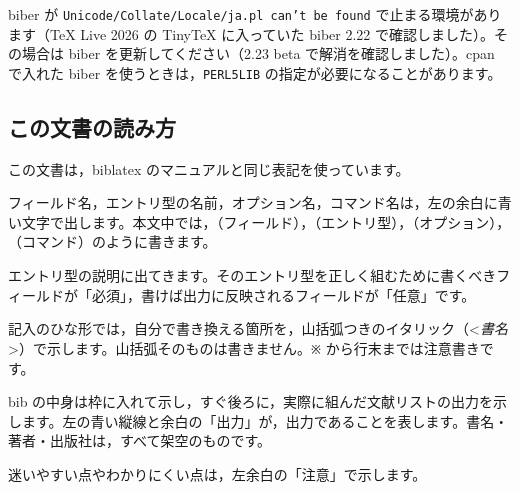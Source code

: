 \begin{caution}
biber が \texttt{Unicode/Collate/Locale/ja.pl can't be found} で止まる環境があります（TeX Live 2026 の TinyTeX に入っていた biber 2.22 で確認しました）。その場合は biber を更新してください（2.23 beta で解消を確認しました）。cpan で入れた biber を使うときは，\texttt{PERL5LIB} の指定が必要になることがあります。
\end{caution}

\subsection{この文書の読み方}\label{sec:howtoread}
この文書は，biblatex のマニュアルと同じ表記を使っています。

\begin{keymarglist}
\item[余白の青い文字]
フィールド名，エントリ型の名前，オプション名，コマンド名は，左の余白に青い文字で出します。本文中では，（フィールド），（エントリ型），（オプション），（コマンド）のように書きます。

\item[必須：，任意：]
エントリ型の説明に出てきます。そのエントリ型を正しく組むために書くべきフィールドが「必須」，書けば出力に反映されるフィールドが「任意」です。

\item[ひな形]
記入のひな形では，自分で書き換える箇所を，山括弧つきのイタリック（<\textit{書名}>）で示します。山括弧そのものは書きません。\texttt{※} から行末までは注意書きです。

\item[記入例と出力]
bib の中身は枠に入れて示し，すぐ後ろに，実際に組んだ文献リストの出力を示します。左の青い縦線と余白の「出力」が，出力であることを表します。書名・著者・出版社は，すべて架空のものです。

\item[注意]
迷いやすい点やわかりにくい点は，左余白の「注意」で示します。
\end{keymarglist}
